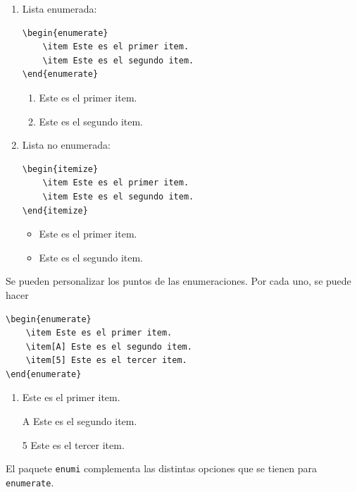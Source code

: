 \documentclass[../notes.tex]{subfiles}
\begin{document}
        \begin{enumerate}
            \item Lista enumerada:
                \begin{verbatim}
\begin{enumerate}
    \item Este es el primer item.
    \item Este es el segundo item.
\end{enumerate}
                \end{verbatim}
\begin{enumerate}
    \item Este es el primer item.
    \item Este es el segundo item.
\end{enumerate}
            \item Lista no enumerada:
                \begin{verbatim}
\begin{itemize}
    \item Este es el primer item.
    \item Este es el segundo item.
\end{itemize}
                \end{verbatim}
\begin{itemize}
    \item Este es el primer item.
    \item Este es el segundo item.
\end{itemize}
        \end{enumerate}
        
    Se pueden personalizar los puntos de las enumeraciones. Por cada uno, se puede hacer
            \begin{verbatim}
\begin{enumerate}
    \item Este es el primer item.
    \item[A] Este es el segundo item.
    \item[5] Este es el tercer item.
\end{enumerate}
            \end{verbatim}
            \begin{enumerate}
                \item Este es el primer item.
                \item[A] Este es el segundo item.
                \item[5] Este es el tercer item.
            \end{enumerate}
    El paquete \texttt{enumi} complementa las distintas opciones que se tienen para \texttt{enumerate}.
    
\end{document}
